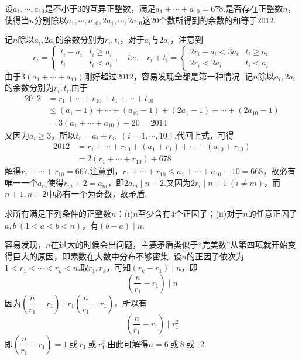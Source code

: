 \documentclass[cn,hazy,black,10pt,normal]{elegantnote}
\newenvironment{guess}{
  \color{guess}}{\newline \color{black}}
\newcommand{\cor}{~\textit{或}~}
\newcommand{\ssb}[1]{\left( #1 \right)}
\begin{document}
\begin{problem} %
	设$a_1, \cdots ,a_{10}$是不小于$3$的互异正整数，满足$a_1+ \cdots + a_{10}=678$.是否存在正整数$n$，使得当$n$分别除以$a_1, \cdots ,a_{10},2a_1, \cdots ,2a_{10}$这$20$个数所得到的余数的和等于$2012$.
\end{problem}
\begin{solution}
	\begin{guess}
		记$n$除以$a_i,2a_i$的余数分别为$r_i,t_i$，对于$a_i$与$2a_i$，注意到$$r_i=\begin{cases}
			t_i-a_i &t_i \geq a_i \\
			t_i &t_i < a_i
		\end{cases},\quad i.e. \quad r_i+t_i=\begin{cases}
			2r_i+a_i<3a_i &t_i \geq a_i \\
			2r_i<2a_i &t_i < a_i
		\end{cases}$$
		由于$3(a_1+ \cdots + a_{10})$刚好超过$2012$，容易发现全都是第一种情况.
	\end{guess}
	记$n$除以$a_i,2a_i$的余数分别为$r_i,t_i$.由于
	\begin{align*}
		2012&=r_1+ \cdots + r_{10} + t_1 + \cdots + t_{10} \\
		&\leq (a_1-1)+ \cdots + (a_{10}-1)+(2a_1-1)+ \cdots + (2a_{10}-1) \\
		&=3(a_1+ \cdots + a_{10})-20=2014
	\end{align*}
	又因为$a_i \geq 3$，所以$t_i=a_i+r_i,~(i=1, \cdots ,10)$.代回上式，可得
	\begin{align*}
		2012 &= r_1+ \cdots + r_{10} + (a_1+r_1) + \cdots + (a_{10}+r_{10}) \\
		&= 2(r_1 + \cdots + r_{10}) + 678
	\end{align*}
	解得$r_1 + \cdots + r_{10}=667$.注意到，$r_1 + \cdots + r_{10} \leq a_1+ \cdots + a_{10}-10=668$，故必有唯一一个$a_m$使得$r_m+2=a_m$，即$2a_m\mid n+2$.又因为$2r_i\mid n+1~(i \neq m)$，而$n+1,n+2$中必有一个为奇数，故矛盾.
\end{solution}

\begin{problem} %
	求所有满足下列条件的正整数$n$：(i)$n$至少含有$4$个正因子；(ii)对于$n$的任意正因子$a,b~(1<a<b<n)$，有$(b-a) \mid n$.
\end{problem}
\begin{solution}
	\begin{guess}
		容易发现，$n$在过大的时候会出问题，主要矛盾类似于“完美数”从第四项就开始变得巨大的原因，即素数在大数中分布不够密集.
	\end{guess}
	设$n$的正因子依次为$1<r_1< \cdots <r_k<n$.取$r_1,r_k$，可知$(r_k-r_1)\mid n$，即$$\ssb{ \frac{n}{r_1}-r_1 }\mid n$$
	因为$\ssb{ \dfrac{n}{r_1}-r_1 } \mid r_1\ssb{ \dfrac{n}{r_1}-r_1 }$，所以有$$\ssb{ \frac{n}{r_1}-r_1 }\mid r_1^2$$
	即$\ssb{ \dfrac{n}{r_1}-r_1}=1 \cor r_1 \cor r_1^2$.由此可解得$n=6 \cor 8 \cor 12$.
\end{solution}
\end{document}

